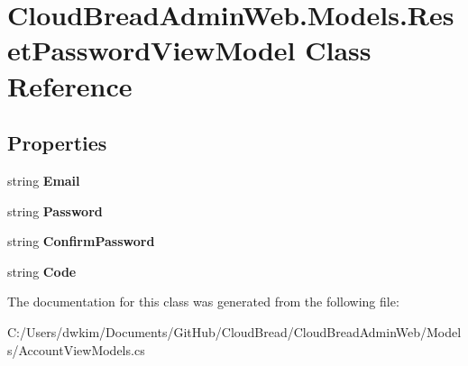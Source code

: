 \hypertarget{class_cloud_bread_admin_web_1_1_models_1_1_reset_password_view_model}{}\section{Cloud\+Bread\+Admin\+Web.\+Models.\+Reset\+Password\+View\+Model Class Reference}
\label{class_cloud_bread_admin_web_1_1_models_1_1_reset_password_view_model}
\subsection*{Properties}
\begin{DoxyCompactItemize}
\item 
string {\bfseries Email}\hypertarget{class_cloud_bread_admin_web_1_1_models_1_1_reset_password_view_model_a17fc82cc36830f1c9e42cff09d76816e}{}\label{class_cloud_bread_admin_web_1_1_models_1_1_reset_password_view_model_a17fc82cc36830f1c9e42cff09d76816e}

\item 
string {\bfseries Password}\hypertarget{class_cloud_bread_admin_web_1_1_models_1_1_reset_password_view_model_a0fa7f59a57aeccf8b60e960fa086e3ef}{}\label{class_cloud_bread_admin_web_1_1_models_1_1_reset_password_view_model_a0fa7f59a57aeccf8b60e960fa086e3ef}

\item 
string {\bfseries Confirm\+Password}\hypertarget{class_cloud_bread_admin_web_1_1_models_1_1_reset_password_view_model_ac3eb6dcbf27043529eb479ce7a7ce7e7}{}\label{class_cloud_bread_admin_web_1_1_models_1_1_reset_password_view_model_ac3eb6dcbf27043529eb479ce7a7ce7e7}

\item 
string {\bfseries Code}\hypertarget{class_cloud_bread_admin_web_1_1_models_1_1_reset_password_view_model_a0a18c436f21a611decd287a98c779b5b}{}\label{class_cloud_bread_admin_web_1_1_models_1_1_reset_password_view_model_a0a18c436f21a611decd287a98c779b5b}

\end{DoxyCompactItemize}


The documentation for this class was generated from the following file\+:\begin{DoxyCompactItemize}
\item 
C\+:/\+Users/dwkim/\+Documents/\+Git\+Hub/\+Cloud\+Bread/\+Cloud\+Bread\+Admin\+Web/\+Models/Account\+View\+Models.\+cs\end{DoxyCompactItemize}
